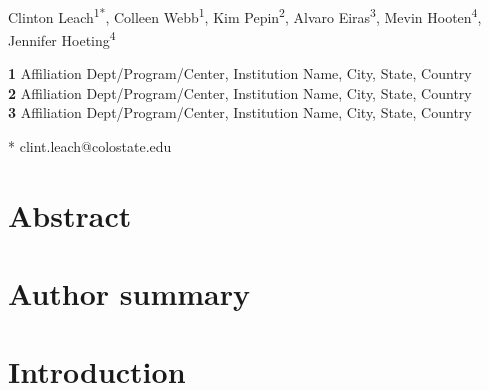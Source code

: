 \documentclass[10pt,letterpaper]{article}
\date{}
\begin{document}
\vspace*{0.2in}

\begin{flushleft}
{\Large
\textbf{}
}
\newline
\\
Clinton Leach\textsuperscript{1*},
Colleen Webb\textsuperscript{1},
Kim Pepin\textsuperscript{2},
Alvaro Eiras\textsuperscript{3},
Mevin Hooten\textsuperscript{4},
Jennifer Hoeting\textsuperscript{4}

\bigskip
\textbf{1} Affiliation Dept/Program/Center, Institution Name, City, State, Country
\\
\textbf{2} Affiliation Dept/Program/Center, Institution Name, City, State, Country
\\
\textbf{3} Affiliation Dept/Program/Center, Institution Name, City, State, Country
\\
\bigskip

% 


* clint.leach@colostate.edu

\end{flushleft}
\section*{Abstract}

\section*{Author summary}

\linenumbers

\section*{Introduction}
\end{document}
